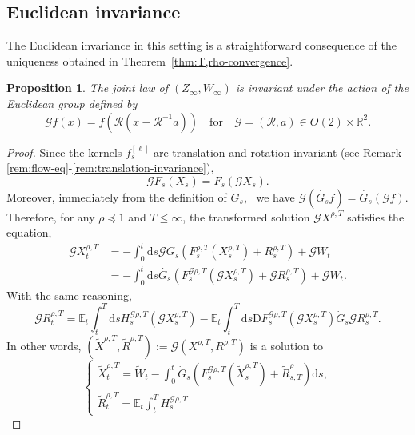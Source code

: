 \documentclass[11pt, a4paper]{scrartcl}
\numberwithin{equation}{section}
\theoremstyle{plain}
\newtheorem{proposition}[foo]{Proposition}
\theoremstyle{remark}
\newcommand{\assign}{:=}
\newcommand{\mathD}{\mathrm{D}}
\newcommand{\mathd}{\mathrm{d}}
\begin{document}
\subsection{Euclidean invariance}

The Euclidean invariance in this setting is a straightforward consequence of
the uniqueness obtained in Theorem~\ref{thm:T,rho-convergence}.

\begin{proposition}
  The joint law of $(Z_{\infty}, W_{\infty})$ is invariant under the action of
  the Euclidean group defined by
  \[ \mathcal{G} f (x) = f (\mathcal{R} (x - \mathcal{R}^{- 1} a))  \quad
     \text{for} \quad \mathcal{G} = (\mathcal{R}, a) \in O (2) \times
     \mathbb{R}^2 . \]
\end{proposition}

\begin{proof}
  Since the kernels $f^{[\ell]}_s$ are translation and rotation invariant (see
  Remark \ref{rem:flow-eq}-\ref{rem:translation-invariance}),
  \[ \mathcal{G} F_s (X_s) = F_s (\mathcal{G} X_s) . \]
  Moreover, immediately from the definition of $\dot{G}_s$, \ we have
  $\mathcal{G} (\dot{G_s} f) = \dot{G_s} (\mathcal{G} f)$. Therefore, for any
  $\rho \preceq  1$ and $T \leqslant \infty$, the transformed solution
  $\mathcal{G} X^{\rho, T}$ satisfies the equation,
  \begin{align*}
    \mathcal{G} X_t^{\rho, T} &= - \int_0^t \mathd s \mathcal{G}  \dot{G}_s
     (F^{\rho, T}_s (X_s^{\rho, T}) + R_s^{\rho, T}) + \mathcal{G} W_t \\
     &= -
     \int_0^t \mathd s \dot{G_s} (F^{\mathcal{G} \rho, T}_s (\mathcal{G}
     X_s^{\rho, T}) + \mathcal{G} R_s^{\rho, T}) + \mathcal{G} W_t .
  \end{align*}
  With the same reasoning,
  \[ \mathcal{G} R_t^{\rho, T} =\mathbb{E}_t  \int_t^T \mathd s H^{\mathcal{G}
     \rho, T}_s (\mathcal{G} X_s^{\rho, T}) -\mathbb{E}_t  \int_t^T \mathd s
     \mathD F^{\mathcal{G} \rho, T}_s (\mathcal{G} X_s^{\rho, T})  \dot{G}_s 
     \mathcal{G} R_s^{\rho, T} . \]
  In other words, $(\tilde{X}^{\rho, T}, \tilde{R}^{\rho, T}) \assign
  \mathcal{G} (X^{\rho, T}, R^{\rho, T})$ is a solution to
  \[ \begin{cases}
       \tilde{X}^{\rho, T}_t = \tilde{W}_t - \int_0^t \dot{G}_s
       (F^{\mathcal{G} \rho, T}_s (\tilde{X}^{\rho, T}_s) + \tilde{R}_{s,
       T}^{\rho}) \mathd s,\\
       \tilde{R}_t^{\rho, T} =\mathbb{E}_t  \int_t^T H^{\mathcal{G} \rho, T}_s

\end{cases}\]
\end{proof}
\end{document}
